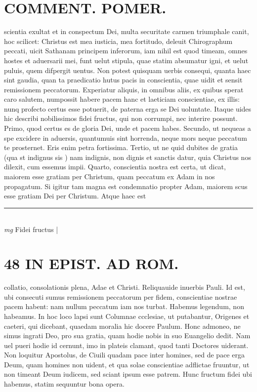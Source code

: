 \documentclass{article}
\begin{document}
\begin{pages}
\section*{COMMENT. POMER.  }\pstart scientia exultat et in conspectum Dei, multa securitate carmen triumphale canit, hoc scilicet: Christus est mea iusticia, mea fortitudo, deleuit Chirographum peccati, uicit Sathanam principem inferorum, iam nihil est quod timeam, omnes hostes et aduersarii mei, funt uelut stipula, quae statim absumatur igni, et uelut puluis, quem difpergit uentus. Non potest quisquam uerbis consequi, quanta haec sint gaudia, quan ta praedicatio hutus pacis in conscientia, quae uidit et sensit remissionem peccatorum. Experiatur aliquis, in omnibus aliis, ex quibus sperat caro salutem, numpossit habere pacem hanc et laeticiam conscientiae, ex illis: nunq profecto certus esse potuerit, de paterna erga se Dei uoluntate. Itaque uides hic describi nobilissimos fidei fructus, qui non corrumpi, nec interire possunt. Primo, quod certus es de gloria Dei, unde et pacem habes. Secundo, ut nequeas a spe excidere in aduersis, quantumuis sint horrenda, neque mors neque peccatum te prosternet. Eris enim petra fortissima. Tertio, ut ne quid dubites de gratia (qua st indignus sis ) nam indignis, non dignis et sanctis datur, quia Christus nos dilexit, cum essemus impii. Quarto, conscientia nostra est certa, ut dicat, maiorem esse gratiam per Christum, quam peccatum ex Adam in nos propagatum. Si igitur tam magna est condemnatio propter Adam, maiorem scus esse gratiam Dei per Christum. Atque haec est  \pend
\vspace{0.5cm}\noindent
\vspace{0.2cm}\rule{1cm}{0.2pt}\\ 
\hspace{0.2cm}\textit{mg}
\footnotesize Fidei fructus 
\normalsize| 
\section*{48 IN EPIST. AD ROM.  }
\marginpar{[ p.]}\pstart collatio, consolationis plena, Adae et Christi. Reliquauide inuerbis Pauli.   \pend\pstart Id est, ubi consecuti sumus remissionem peccatorum per fidem, conscientiae nostrae pacem habent: nam nullum peccatum iam nos turbat. Habemus legendum, non habeamus. In hoc loco lapsi sunt Columnae ccclesiae, ut putabantur, Origenes et caeteri, qui dicebant, quaedam moralia hic docere Paulum.  Honc admoneo, ne simus ingrati Deo, pro sua gratia, quam hodie nobis in suo Euangelio dedit. Nam uel pueri hodie id cernunt, imo in plateis clamant, quod tanti Doctores uiderant. Non loquitur Apostolus, de Ciuili quadam pace inter homines, sed de pace erga Deum, quam homines non uident, et qua solae conscientiae adflictae fruuntur, ut non timeant Deum iudicem, sed sciant ipsum esse patrem. Hunc fructum fidei ubi habemus, statim sequuntur bona opera.   \pend
{}
{}

\end{pages}
\end{document}
